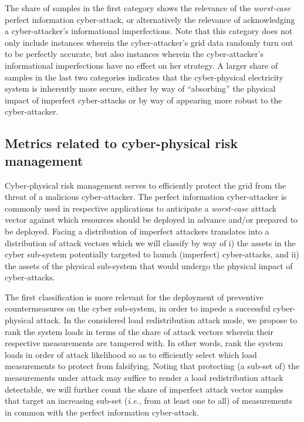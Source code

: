\documentclass{IEEEtran4PSCC}
\begin{document}
The share of samples in the first category shows the relevance of the \emph{worst-case} perfect information cyber-attack, or alternatively the relevance of acknowledging a cyber-attacker's informational imperfections.  Note that this category does not
only include instances wherein the cyber-attacker's grid data randomly turn out to be perfectly accurate, but also instances wherein the cyber-attacker's informational imperfections have no effect on her strategy. A larger share of samples in the last two categories  {indicates} that the cyber-physical electricity system is inherently  {more} secure, either by way of ``absorbing'' the physical impact of imperfect cyber-attacks or by way of appearing more robust to the cyber-attacker. 

\subsection{Metrics related to cyber-physical risk management}
\label{mgmt_metrics}
Cyber-physical risk management serves to efficiently protect the grid from the threat of a malicious cyber-attacker. The perfect information cyber-attacker is commonly used in respective applications to anticipate a \emph{worst-case} atttack vector against which resources should be deployed in advance and/or prepared to be deployed. Facing a distribution of imperfect attackers translates into a distribution of attack vectors which we will classify by way of i) the assets in the cyber sub-system potentially targeted to launch  {(imperfect)} cyber-attacks, and ii) the assets of the physical sub-system that would undergo the physical impact of cyber-attacks. 

The first classification is more relevant for the deployment of preventive countermeasures on the cyber sub-system, in order to impede a successful cyber-physical attack. In the considered load redistribution attack mode, we propose to rank the system loads in terms of the share of attack vectors wherein their respective measurements are tampered with. In other words, rank the system loads in order of attack likelihood so as to efficiently select which load measurements to protect from falsifying. Noting that protecting (a sub-set of) the measurements under attack may suffice to render a load redistribution attack detectable, we will further count the share of imperfect attack vector samples that target an increasing sub-set (\textit{i.e.}, from at least one to all) of measurements in common with the perfect information cyber-attack.
\end{document}

